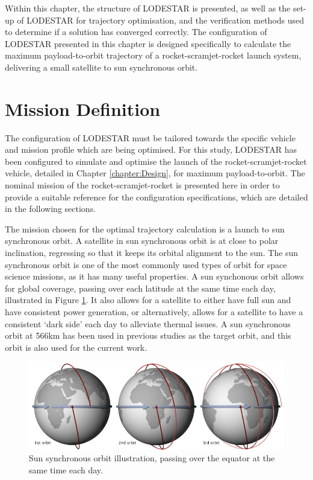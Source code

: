  Within this chapter, the structure of LODESTAR is presented, as well as the set-up of LODESTAR for trajectory optimisation, and the verification methods used to determine if a solution has converged correctly.
 The configuration of LODESTAR presented in this chapter is designed specifically to calculate the maximum payload-to-orbit trajectory of a rocket-scramjet-rocket launch system, delivering a small satellite to sun synchronous orbit. 
 



\section{Mission Definition}\label{sec:mission}
The configuration of LODESTAR must be tailored towards the specific vehicle and mission profile which are being optimised. For this study, LODESTAR has been configured to simulate and optimise the launch of the rocket-scramjet-rocket vehicle, detailed in Chapter \ref{chapter:Design}, for maximum payload-to-orbit.
The nominal mission of the rocket-scramjet-rocket is presented here in order to provide a suitable reference for the configuration specifications, which are detailed in the following sections. 

The mission chosen for the optimal trajectory calculation is a launch to sun synchronous orbit. 
A satellite in sun synchronous orbit is at close to polar inclination, regressing so that it keeps its orbital alignment to the sun. The sun synchronous orbit is one of the most commonly used types of orbit for space science missions, as it has many useful properties\cite{Boain2004}. A sun synchonous orbit allows for global coverage, passing over each latitude at the same time each day, illustrated in Figure \ref{fig:SSO}. It also allows for a satellite to either have full sun and have consistent power generation, or alternatively, allows for a satellite to have a consistent `dark side' each day to alleviate thermal issues\cite{Boain2004}. A sun synchronous orbit at 566km has been used in previous studies as the target orbit\cite{Preller2017b}, and this orbit is also used for the current work. 
\begin{figure}[ht]
	\centering
	\includegraphics[width=0.8\linewidth]{figures/4_LODESTAR/SSO}
	\caption{Sun synchronous orbit illustration, passing over the equator at the same time each day\cite{NASASSO}.}
	\label{fig:SSO}
\end{figure}

